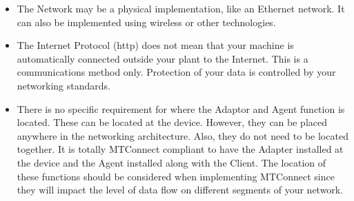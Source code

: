 \begin{itemize}
\item The Network may be a physical implementation, like an Ethernet network. It can also be implemented using wireless or other technologies.
\item The Internet Protocol (http) does not mean that your machine is automatically connected outside your plant to the Internet. This is a communications method only. Protection of your data is controlled by your networking standards. 
\item There is no specific requirement for where the Adaptor and Agent function is located. These can be located at the device. However, they can be placed anywhere in the networking architecture. Also, they do not need to be located together. It is totally MTConnect compliant to have the Adapter installed at the device and the Agent installed along with the Client. The location of these functions should be considered when implementing MTConnect since they will impact the level of data flow on different segments of your network.
\end{itemize}
